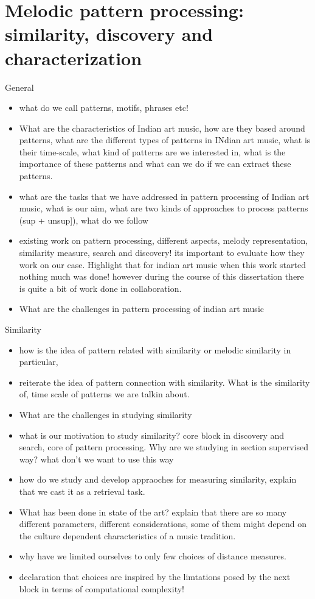 
\chapter{Melodic pattern processing: similarity, discovery and characterization}
\label{chap:melodic_pattern_processing}

General
\begin{itemize}
	\item what do we call patterns, motifs, phrases etc!
	\item What are the characteristics of Indian art music, how are they based around patterns, what are the different types of patterns in INdian art music, what is their time-scale, what kind of patterns are we interested in, what is the importance of these patterns and what can we do if we can extract these patterns.
	\item what are the tasks that we have addressed in pattern processing of Indian art music, what is our aim, what are two kinds of approaches to process patterns (sup + unsup]), what do we follow
	\item existing work on pattern processing, different aspects, melody representation, similarity measure, search and discovery! its important to evaluate how they work on our case. Highlight that for indian art music when this work started nothing much was done! however during the course of this dissertation there is quite a bit of work done in collaboration. 
	\item What are the challenges in pattern processing of indian art music	
\end{itemize}



Similarity
\begin{itemize}
	\item how is the idea of pattern related with similarity or melodic similarity in particular,
	\item reiterate the idea of pattern connection with similarity. What is the similarity of, time scale of patterns we are talkin about.
	\item What are the challenges in studying similarity
	\item what is our motivation to study similarity? core block in discovery and search, core of pattern processing. Why are we studying in section supervised way? what don't we want to use this way
	\item how do we study and develop appraoches for measuring similarity, explain that we cast it as a retrieval task.
	\item What has been done in state of the art? explain that there are so many different parameters, different considerations, some of them might depend on the culture dependent characteristics of a music tradition.
	\item why have we limited ourselves to only few choices of distance measures.
	\item declaration that choices are inspired by the limtations posed by the next block in terms of computational complexity!
\end{itemize}

